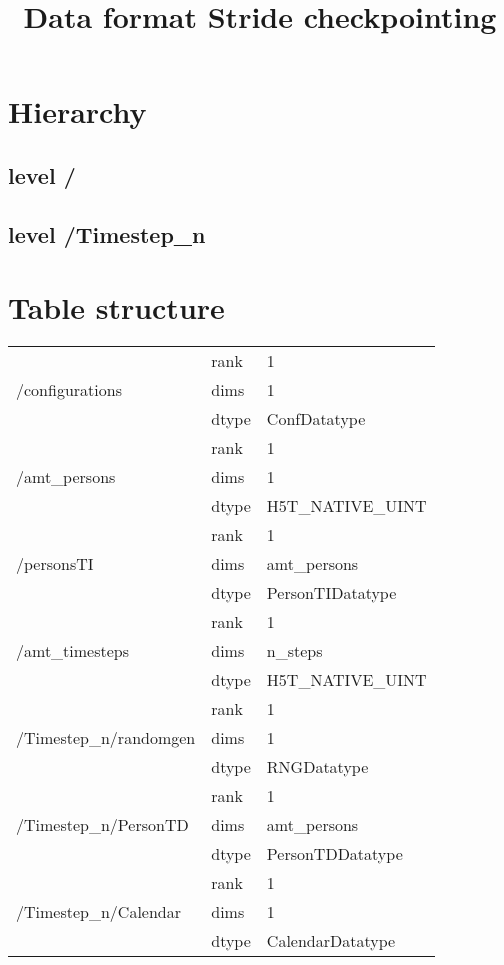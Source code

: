 \documentclass{article}
\title{Data format Stride checkpointing}
\begin{document}
	\maketitle
	\section{Hierarchy}
	\subsection{level /}
	\subsection{level /Timestep\_n}

	\section{Table structure}
		\begin{tabular}{ |l|l|l| }
		\hline

		\multirow{3}{*}{/configurations} & rank & 1 \\
		& dims & 1 \\
		& dtype & ConfDatatype \\ \hline

		\multirow{3}{*}{/amt\_persons} & rank & 1 \\
		& dims & 1 \\
		& dtype & H5T\_NATIVE\_UINT \\ \hline

		\multirow{3}{*}{/personsTI} & rank & 1 \\
		& dims & amt\_persons \\
		& dtype & PersonTIDatatype \\ \hline

		\multirow{3}{*}{/amt\_timesteps} & rank & 1 \\
		& dims & n\_steps \\
		& dtype & H5T\_NATIVE\_UINT \\ \hline

		\multirow{3}{*}{/Timestep\_n/randomgen} & rank & 1 \\
		& dims & 1 \\
		& dtype & RNGDatatype \\ \hline

		\multirow{3}{*}{/Timestep\_n/PersonTD} & rank & 1 \\
		& dims & amt\_persons \\
		& dtype & PersonTDDatatype \\ \hline

		\multirow{3}{*}{/Timestep\_n/Calendar} & rank & 1 \\
		& dims & 1 \\
		& dtype & CalendarDatatype \\ \hline
		\end{tabular}
		\\ \\
		
\end{document}
